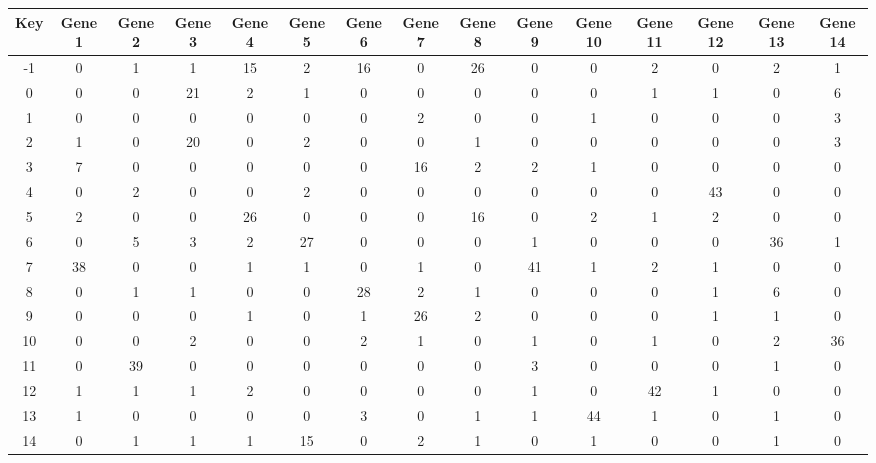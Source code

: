 \begin{tabular}{|c|c|c|c|c|c|c|c|c|c|c|c|c|c|c|}
\hline
Key & Gene 1 & Gene 2 & Gene 3 & Gene 4 & Gene 5 & Gene 6 & Gene 7 & Gene 8 & Gene 9 & Gene 10 & Gene 11 & Gene 12 & Gene 13 & Gene 14 \\
\hline
-1 & 0 & 1 & 1 & 15 & 2 & 16 & 0 & 26 & 0 & 0 & 2 & 0 & 2 & 1 \\
0 & 0 & 0 & 21 & 2 & 1 & 0 & 0 & 0 & 0 & 0 & 1 & 1 & 0 & 6 \\
1 & 0 & 0 & 0 & 0 & 0 & 0 & 2 & 0 & 0 & 1 & 0 & 0 & 0 & 3 \\
2 & 1 & 0 & 20 & 0 & 2 & 0 & 0 & 1 & 0 & 0 & 0 & 0 & 0 & 3 \\
3 & 7 & 0 & 0 & 0 & 0 & 0 & 16 & 2 & 2 & 1 & 0 & 0 & 0 & 0 \\
4 & 0 & 2 & 0 & 0 & 2 & 0 & 0 & 0 & 0 & 0 & 0 & 43 & 0 & 0 \\
5 & 2 & 0 & 0 & 26 & 0 & 0 & 0 & 16 & 0 & 2 & 1 & 2 & 0 & 0 \\
6 & 0 & 5 & 3 & 2 & 27 & 0 & 0 & 0 & 1 & 0 & 0 & 0 & 36 & 1 \\
7 & 38 & 0 & 0 & 1 & 1 & 0 & 1 & 0 & 41 & 1 & 2 & 1 & 0 & 0 \\
8 & 0 & 1 & 1 & 0 & 0 & 28 & 2 & 1 & 0 & 0 & 0 & 1 & 6 & 0 \\
9 & 0 & 0 & 0 & 1 & 0 & 1 & 26 & 2 & 0 & 0 & 0 & 1 & 1 & 0 \\
10 & 0 & 0 & 2 & 0 & 0 & 2 & 1 & 0 & 1 & 0 & 1 & 0 & 2 & 36 \\
11 & 0 & 39 & 0 & 0 & 0 & 0 & 0 & 0 & 3 & 0 & 0 & 0 & 1 & 0 \\
12 & 1 & 1 & 1 & 2 & 0 & 0 & 0 & 0 & 1 & 0 & 42 & 1 & 0 & 0 \\
13 & 1 & 0 & 0 & 0 & 0 & 3 & 0 & 1 & 1 & 44 & 1 & 0 & 1 & 0 \\
14 & 0 & 1 & 1 & 1 & 15 & 0 & 2 & 1 & 0 & 1 & 0 & 0 & 1 & 0 \\
\hline
\end{tabular}